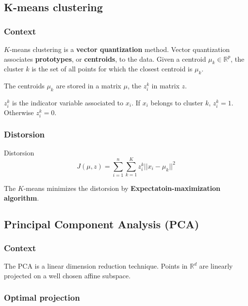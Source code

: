 \documentclass[
10pt, %
a4paper, %
oneside, %
headinclude,footinclude, %
BCOR5mm, %
]{scrartcl}
\begin{document}
\subsection{\large\color{MidnightBlue}K-means clustering}

\subsubsection{\large\color{Periwinkle}Context}

$K$-means clustering is a \textbf{{vector quantization}} method. Vector  quantization associates \textbf{{prototypes}}, or \textbf{{centroids}}, to the data. Given a centroid $\mu_k\in \mathbb{R}^p$, the cluster $k$ is the set of all points for which the closest centroid is $\mu_k$.

The centroids $\mu_k$ are stored in a matrix $\mu$, the $z_i^k$ in matrix $z$.

$z_i^k$ is the indicator variable associated to $x_i$. If $x_i$ belongs to cluster $k$, $z_i^k=1$. Otherwise $z_i^k=0$.

\subsubsection{\large\color{Periwinkle}Distorsion}

\begin{definition}{Distorsion}
    \begin{equation*}
    J(\mu, z) = \sum^{n}_{i=1} \sum^{K}_{k=1} z_i^k||x_i-\mu_k||^2
    \end{equation*}
\end{definition}

The $K$-means minimizes the distorsion by \textbf{{Expectatoin-maximization algorithm}}.

\subsection{\large\color{MidnightBlue}Principal Component Analysis (PCA)}

\subsubsection{\large\color{Periwinkle}Context}

The PCA is a linear dimension reduction technique. Points in $ \mathbb{R}^d$ are linearly projected on a well chosen affine subspace.

\subsubsection{\large\color{Periwinkle}Optimal projection}
\end{document}
